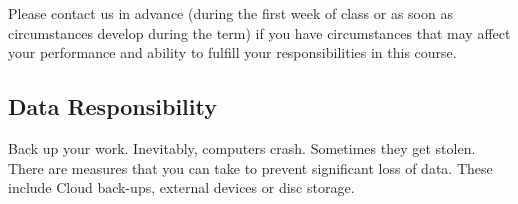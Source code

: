 Please contact us in advance (during the first week of class or as soon as circumstances develop during the term) if you have circumstances that may affect your performance and ability to fulfill your responsibilities in this course.

\subsection{Data Responsibility}

Back up your work. Inevitably, computers crash. Sometimes they get stolen. There are measures that you can take to prevent significant loss of data. These include Cloud back-ups, external devices or disc storage.
